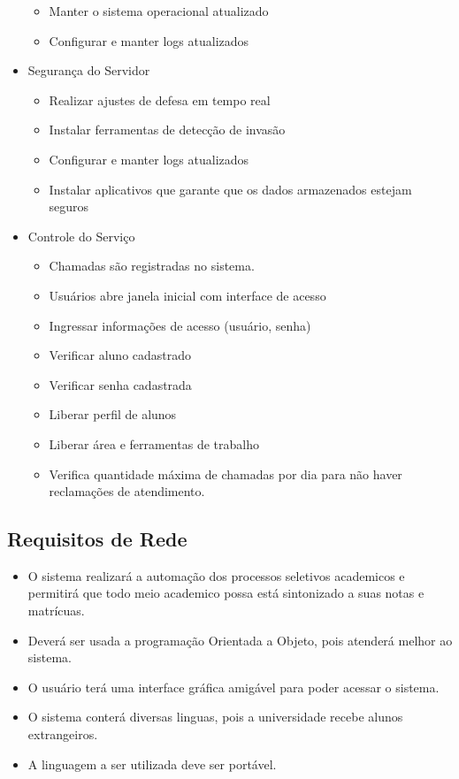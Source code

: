 \begin{itemize}
\begin{itemize}
	\item Manter o sistema operacional atualizado
	\item Configurar e manter logs atualizados
	\end{itemize}
\item Segurança do Servidor
	\begin{itemize}
	\item Realizar ajustes de defesa em tempo real
	\item Instalar ferramentas de detecção de invasão
	\item Configurar e manter logs atualizados
	\item Instalar aplicativos que garante que os dados armazenados estejam seguros
	\end{itemize}
\item Controle do Serviço
	\begin{itemize}
	\item Chamadas são registradas no sistema.
	\item Usuários abre janela inicial com interface de acesso 
	\item Ingressar informações de acesso (usuário, senha) 
	\item Verificar aluno cadastrado 
	\item Verificar senha cadastrada 
	\item Liberar perfil de alunos 
	\item Liberar área e ferramentas de trabalho 
	\item Verifica quantidade máxima de chamadas por dia para não haver reclamações de atendimento.
	\end{itemize}


   \end{itemize}

   \subsection{Requisitos de Rede}
     \begin{itemize}
      \item O sistema realizará a automação dos processos seletivos academicos e permitirá que todo meio academico possa está sintonizado a suas notas e matrícuas.
      \item Deverá ser usada a programação Orientada a Objeto, pois atenderá melhor ao sistema.
      \item O usuário terá uma interface gráfica amigável para poder acessar o sistema.
      \item O sistema conterá diversas linguas, pois a universidade recebe alunos extrangeiros.
      \item A linguagem a ser utilizada deve ser portável.
     \end{itemize}
     
